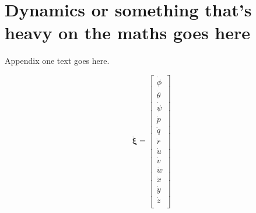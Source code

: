 \documentclass[journal]{IEEEtran}
\begin{document}
	
	
	
	
	\appendices
	\section{Dynamics or something that's heavy on the maths goes here}
	Appendix one text goes here.
	
		\begin{equation} \label{eq:derivpos_earth_body}
	\bm{\dot \xi} = \left[ {\begin{array}{c}
		\dot \phi\\
		\dot \theta\\
		\dot \psi\\
		\dot p\\
		\dot q\\
		\dot r\\
		\dot u\\
		\dot v\\
		\dot w\\
		\dot x\\
		\dot y\\
		\dot z\\
		
		\end{array} } \right]
	\end{equation}
	
\end{document}
